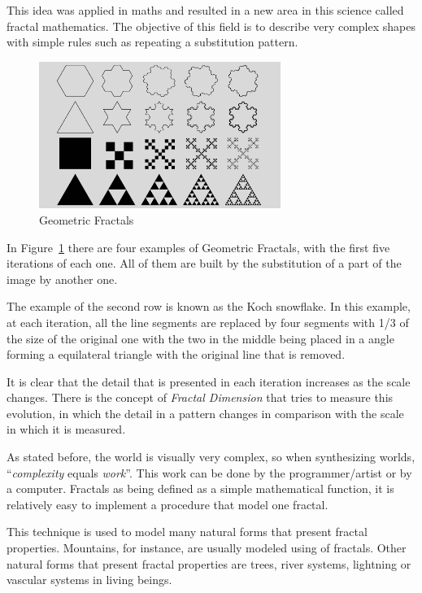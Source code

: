 This idea was applied in maths and resulted in a new area in this science called fractal mathematics. The objective of this field is to describe very complex shapes with simple rules such as repeating a substitution pattern. 

\begin{figure}[htbp]
	\centering
	\includegraphics[width=0.7\textwidth]{images/Theory/Fractals/Fractal1_1000.png}
	\caption{Geometric Fractals}
	\label{fig:GFractals}
\end{figure}

In Figure~\ref{fig:GFractals} there are four examples of Geometric Fractals, with the first five iterations of each one. All of them are built by the substitution of a part of the image by another one. 

The example of the second row is known as the Koch snowflake. In this example, at each iteration, all the line segments are replaced by four segments with 1/3 of the size of the original one with the two in the middle being placed in a angle forming a equilateral triangle with the original line that is removed.

It is clear that the detail that is presented in each iteration increases as the scale changes. There is the concept of \emph{Fractal Dimension} that tries to measure this evolution, in which the detail in a pattern changes in comparison with the scale in which it is measured.

As stated before, the world is visually very complex, so when synthesizing worlds, ``\emph{complexity} equals \emph{work}''\cite{Ebert2002}. This work can be done by the programmer/artist or by a computer. Fractals as being defined as a simple mathematical function, it is relatively easy to implement a procedure that model one fractal. 

This technique is used to model many natural forms that present fractal properties. Mountains, for instance, are usually modeled using of fractals. Other natural forms that present fractal properties are trees, river systems, lightning or vascular systems in living beings.




